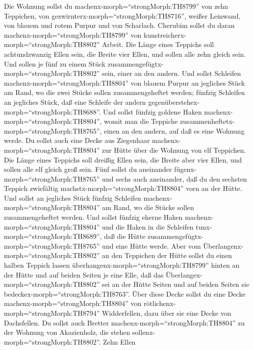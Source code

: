  Die Wohnung sollst du machenx-morph=``strongMorph:TH8799''
von zehn Teppichen, von gezwirnterx-morph=``strongMorph:TH8716'', weißer
Leinwand, von blauem und rotem Purpur und von Scharlach. Cherubim sollst
du daran machenx-morph=``strongMorph:TH8799'' von
kunstreicherx-morph=``strongMorph:TH8802'' Arbeit.  Die
Länge eines Teppichs soll achtundzwanzig Ellen sein, die Breite vier
Ellen, und sollen alle zehn gleich sein.  Und sollen je fünf
zu einem Stück zusammengefügtx-morph=``strongMorph:TH8802'' sein, einer
an den andern.  Und sollst Schleifen
machenx-morph=``strongMorph:TH8804'' von blauem Purpur an jegliches
Stück am Rand, wo die zwei Stücke sollen zusammengeheftet werden;
 fünfzig Schleifen an jegliches Stück, daß eine Schleife der
andern gegenüberstehex-morph=``strongMorph:TH8688''.  Und
sollst fünfzig goldene Haken machenx-morph=``strongMorph:TH8804'', womit
man die Teppiche zusammenheftetx-morph=``strongMorph:TH8765'', einen an
den andern, auf daß es eine Wohnung werde.  Du sollst auch
eine Decke aus Ziegenhaar machenx-morph=``strongMorph:TH8804'' zur Hütte
über die Wohnung von elf Teppichen.  Die Länge eines
Teppichs soll dreißig Ellen sein, die Breite aber vier Ellen, und sollen
alle elf gleich groß sein.  Fünf sollst du aneinander
fügenx-morph=``strongMorph:TH8765'' und sechs auch aneinander, daß du
den sechsten Teppich zwiefältig machstx-morph=``strongMorph:TH8804''
vorn an der Hütte.  Und sollst an jegliches Stück fünfzig
Schleifen machenx-morph=``strongMorph:TH8804'' am Rand, wo die Stücke
sollen zusammengeheftet werden.  Und sollst fünfzig eherne
Haken machenx-morph=``strongMorph:TH8804'' und die Haken in die
Schleifen tunx-morph=``strongMorph:TH8689'', daß die Hütte
zusammengefügtx-morph=``strongMorph:TH8765'' und eine Hütte werde.
 Aber vom Überlangenx-morph=``strongMorph:TH8802'' an den
Teppichen der Hütte sollst du einen halben Teppich lassen
überhangenx-morph=``strongMorph:TH8799'' hinten an der Hütte
 und auf beiden Seiten je eine Elle, daß das
Überlangex-morph=``strongMorph:TH8802'' sei an der Hütte Seiten und auf
beiden Seiten sie bedeckex-morph=``strongMorph:TH8763''. 
Über diese Decke sollst du eine Decke
machenx-morph=``strongMorph:TH8804'' von
rötlichenx-morph=``strongMorph:TH8794'' Widderfellen, dazu über sie eine
Decke von Dachsfellen.  Du sollst auch Bretter
machenx-morph=``strongMorph:TH8804'' zu der Wohnung von Akazienholz, die
stehen sollenx-morph=``strongMorph:TH8802''.  Zehn Ellen
